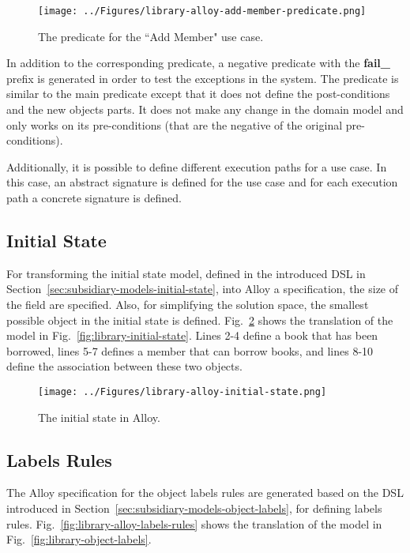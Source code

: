 \begin{figure}[h]
\centering
\texttt{[image: ../Figures/library-alloy-add-member-predicate.png]}
\caption{The predicate for the ``Add Member" use case.}
\label{fig:library-alloy-add-member-predicate}
\end{figure}

In addition to the corresponding predicate, a negative predicate with the \textbf{fail\_} prefix is generated in order to test the exceptions in the system. The predicate is similar to the main predicate except that it does not define the post-conditions and the new objects parts. It does not make any change in the domain model and only works on its pre-conditions (that are the negative of the original pre-conditions).

Additionally, it is possible to define different execution paths for a use case. In this case, an abstract signature is defined for the use case and for each execution path a concrete signature is defined. 

\subsection{Initial State}
\label{sec:alloy-initial-state}
For transforming the initial state model, defined in the introduced DSL in Section~\ref{sec:subsidiary-models-initial-state}, into Alloy a specification, the size of the field are specified. Also, for simplifying the solution space, the smallest possible object in the initial state is defined. Fig.~\ref{fig:library-alloy-initial-state} shows the translation of the model in Fig.~\ref{fig:library-initial-state}. Lines 2-4 define a book that has been borrowed, lines 5-7 defines a member that can borrow books, and lines 8-10 define the association between these two objects.

\begin{figure}[h]
\centering
\texttt{[image: ../Figures/library-alloy-initial-state.png]}
\caption{The initial state in Alloy.}
\label{fig:library-alloy-initial-state}
\end{figure}

\subsection{Labels Rules}
\label{sec:alloy-labels-rules}
The Alloy specification for the object labels rules are generated based on the DSL introduced in Section~\ref{sec:subsidiary-models-object-labels}, for defining labels rules. Fig.~\ref{fig:library-alloy-labels-rules} shows the translation of the model in Fig.~\ref{fig:library-object-labels}.


